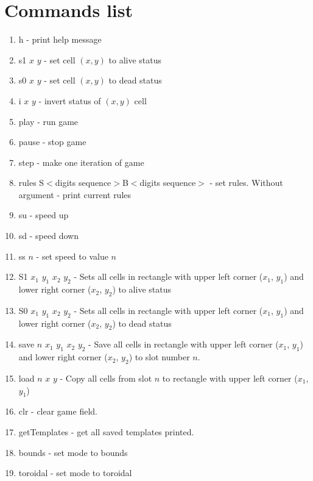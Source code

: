 \section*{Commands list}

\begin{enumerate}
	\item \textsf{h} - print help message
	\item \textsf{s1 $x$ $y$} - set cell $(x, y)$ to alive status
	\item \textsf{s0 $x$ $y$} - set cell $(x, y)$ to dead status
	\item \textsf{i $x$ $y$} - invert status of $(x, y)$ cell
	\item \textsf{play} - run game
	\item \textsf{pause} - stop game
	\item \textsf{step} - make one iteration of game
	\item \textsf{rules S$<$digits sequence$>$B$<$digits sequence$>$} - set rules. Without argument - print current rules
	\item \textsf{su} - speed up
	\item \textsf{sd} - speed down
	\item \textsf{ss $n$} - set speed to value $n$
	\item \textsf{S1 $x_{1}$ $y_{1}$ $x_{2}$ $y_{2}$} -  Sets all cells in rectangle with upper left corner ($x_{1}$, $y_{1}$) and lower right corner ($x_{2}$, $y_{2}$) to alive status
	\item \textsf{S0 $x_{1}$ $y_{1}$ $x_{2}$ $y_{2}$} -  Sets all cells in rectangle with upper left corner ($x_{1}$, $y_{1}$) and lower right corner ($x_{2}$, $y_{2}$) to dead status
	\item \textsf{save $n$ $x_{1}$ $y_{1}$ $x_{2}$ $y_{2}$} - Save all cells in rectangle with upper left corner ($x_{1}$, $y_{1}$) and lower right corner ($x_{2}$, $y_{2}$) to slot number $n$.
	\item \textsf{load $n$ $x$ $y$} - Copy all cells from slot $n$ to rectangle with upper left corner ($x_{1}$, $y_{1}$)
	\item \textsf{clr} - clear game field.
	\item \textsf{getTemplates} - get all saved templates printed.
	\item \textsf{bounds} - set mode to bounds
	\item \textsf{toroidal} - set mode to toroidal
\end{enumerate}
